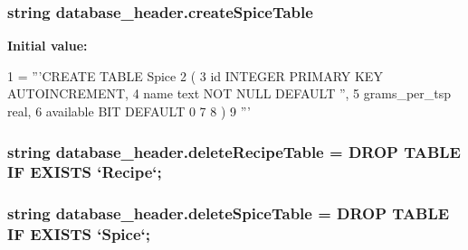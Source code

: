 \subsubsection[{\texorpdfstring{create\+Spice\+Table}{createSpiceTable}}]{\setlength{\rightskip}{0pt plus 5cm}string database\+\_\+header.\+create\+Spice\+Table}\hypertarget{namespacedatabase__header_a1e3043bca03600416421e49e7abceddf}{}\label{namespacedatabase__header_a1e3043bca03600416421e49e7abceddf}
{\bfseries Initial value\+:}
\begin{DoxyCode}
1 = \textcolor{stringliteral}{'''CREATE TABLE Spice}
2 \textcolor{stringliteral}{                        (}
3 \textcolor{stringliteral}{                            id INTEGER PRIMARY KEY AUTOINCREMENT,}
4 \textcolor{stringliteral}{                            name text NOT NULL DEFAULT '', }
5 \textcolor{stringliteral}{                            grams\_per\_tsp real,}
6 \textcolor{stringliteral}{                            available BIT DEFAULT 0     }
7 \textcolor{stringliteral}{            }
8 \textcolor{stringliteral}{                        )}
9 \textcolor{stringliteral}{                   '''}
\end{DoxyCode}
\subsubsection[{\texorpdfstring{delete\+Recipe\+Table}{deleteRecipeTable}}]{\setlength{\rightskip}{0pt plus 5cm}string database\+\_\+header.\+delete\+Recipe\+Table = \textquotesingle{}D\+R\+OP T\+A\+B\+LE IF E\+X\+I\+S\+TS `Recipe`;\textquotesingle{}}\hypertarget{namespacedatabase__header_aa86f8403cffc6b4443b9a220eb1192c7}{}\label{namespacedatabase__header_aa86f8403cffc6b4443b9a220eb1192c7}
\subsubsection[{\texorpdfstring{delete\+Spice\+Table}{deleteSpiceTable}}]{\setlength{\rightskip}{0pt plus 5cm}string database\+\_\+header.\+delete\+Spice\+Table = \textquotesingle{}D\+R\+OP T\+A\+B\+LE IF E\+X\+I\+S\+TS `Spice`;\textquotesingle{}}\hypertarget{namespacedatabase__header_a2f8921645ad6be4726eb88f353a6f992}{}\label{namespacedatabase__header_a2f8921645ad6be4726eb88f353a6f992}

